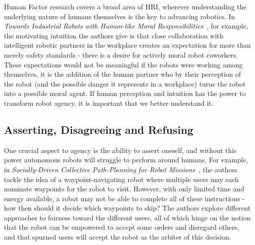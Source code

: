 \documentclass{sfuthesis}
\begin{document}
Human Factor research covers a broad area of HRI, wherever understanding the underlying nature of humans themselves is the key to advancing robotics. In \textit{Towards Industrial Robots with Human-like Moral Responsibilities}~\cite{ccuruklu2010towards}, for example, the motivating intuition the authors give is that close collaboration with intelligent robotic partners in the workplace creates an expectation for more than merely safety standards - there is a desire for actively moral robot coworkers. These expectations would not be meaningful if the robots were working among themselves, it is the addition of the human partner who by their perception of the robot (and the possible danger it represents in a workplace) turns the robot into a possible moral agent. If human perception and intuition has the power to transform robot agency, it is important that we better understand it.









\subsection{Asserting, Disagreeing and Refusing}

One crucial aspect to agency is the ability to assert oneself, and without this power autonomous robots will struggle to perform around humans. For example, in \textit{Socially-Driven Collective Path-Planning for Robot Missions}~\cite{higuera2012socially}, the authors tackle the idea of a waypoint-navigating robot where multiple users may each nominate waypoints for the robot to visit. However, with only limited time and energy available, a robot may not be able to complete all of these instructions - how then should it decide which waypoints to skip? The authors explore different approaches to fairness toward the different users, all of which hinge on the notion that the robot can be empowered to accept some orders and disregard others, and that spurned users will accept the robot as the arbiter of this decision. 
\end{document}
